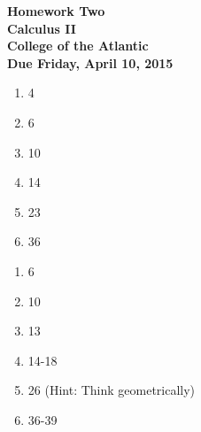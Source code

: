 \documentclass[12pt]{article}
\begin{document}
\pagestyle{empty}
 
\begin{center}
{\LARGE {\bf Homework Two}}\\
\bigskip
{\Large {\bf Calculus II}}\\
\bigskip
{\Large {\bf College of the Atlantic}}\\
\bigskip
{ {\bf Due Friday, April 10, 2015}}\\ 
\end{center}




\begin{enumerate}
\setlength{\itemsep}{-1mm}
  \item 4
  \item 6
  \item 10
  \item 14
  \item 23
  \item 36

\end{enumerate}




\begin{enumerate}
\setlength{\itemsep}{-1mm}
  \item 6
  \item 10
  \item 13
  \item 14-18
  \item 26 (Hint: Think geometrically)
  \item 36-39

\end{enumerate}


%





\end{document}
